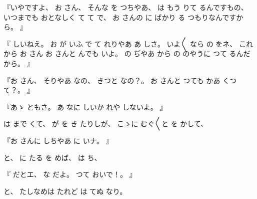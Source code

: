 %
『いやですよ、
%
お
さん、
%
そんな
を
つちやあ、
%
は
もう
りて
るんですもの、
%
いつまでも
おとなしく
て
て
で、
%
お
さんの
に
ばかり
る
つもりなんですから。
』

%
『
しいねえ。
%
お
が
いふ
で
て
れりやあ
あ
しさ。
%
いよ〳〵
なら
の
をネ、
%
これから
お
さん
お
さんと
んでも
いよ。
%
の
ぢやあ
から
の
のやうに
つて
るんだから。
』

%
『お
さん、
%
そりやあ
なの、
%
きつと
なの？。
%
お
さんと
つても
かあ
くつて？。
』

%
『あゝ
ともさ。
%
あ
なに
しいか
れや
しないよ。
』

%
は
まで
くて、
%
が
を
き
たりしが、
%
こゝに
むぐ〳〵と
を
かして、

%
『お
さんに
しちやあ
に
いナ。
』

%
と、
%
に
たる
を
めば、
%
は
ち、

%
『
だとエ、
%
な
だよ。
%
つて
おいで！。
』

%
と、
%
たしなめは
たれど
は
てぬ
なり。

